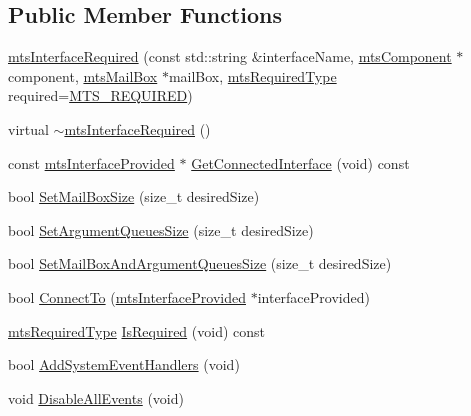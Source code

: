 \subsection*{Public Member Functions}
\begin{DoxyCompactItemize}
\item 
\hyperlink{classmts_interface_required_a63ce5c4fbbfae3627f118818707b8712}{mts\-Interface\-Required} (const std\-::string \&interface\-Name, \hyperlink{classmts_component}{mts\-Component} $\ast$component, \hyperlink{classmts_mail_box}{mts\-Mail\-Box} $\ast$mail\-Box, \hyperlink{mts_forward_declarations_8h_a9ef1ce54724afde7802db326ff8606f3}{mts\-Required\-Type} required=\hyperlink{mts_forward_declarations_8h_a9ef1ce54724afde7802db326ff8606f3ae01fd85391b60e546bbb1be9716c4ec9}{M\-T\-S\-\_\-\-R\-E\-Q\-U\-I\-R\-E\-D})
\item 
virtual \hyperlink{classmts_interface_required_ac44703c9161331b2b816ffbecac1e661}{$\sim$mts\-Interface\-Required} ()
\item 
const \hyperlink{classmts_interface_provided}{mts\-Interface\-Provided} $\ast$ \hyperlink{classmts_interface_required_a461c0fbbf35afcb27fb849abd1e0b093}{Get\-Connected\-Interface} (void) const 
\item 
bool \hyperlink{classmts_interface_required_ab87c1f6386cd1e27457af53a8f01d95e}{Set\-Mail\-Box\-Size} (size\-\_\-t desired\-Size)
\item 
bool \hyperlink{classmts_interface_required_a1f1d352367c25bdad40115a39638f12e}{Set\-Argument\-Queues\-Size} (size\-\_\-t desired\-Size)
\item 
bool \hyperlink{classmts_interface_required_a4c67d774d33c69ee2777549f9192d89b}{Set\-Mail\-Box\-And\-Argument\-Queues\-Size} (size\-\_\-t desired\-Size)
\item 
bool \hyperlink{classmts_interface_required_aa92fb5c95ad7f9fd4100cec0105e3381}{Connect\-To} (\hyperlink{classmts_interface_provided}{mts\-Interface\-Provided} $\ast$interface\-Provided)
\item 
\hyperlink{mts_forward_declarations_8h_a9ef1ce54724afde7802db326ff8606f3}{mts\-Required\-Type} \hyperlink{classmts_interface_required_ab9532cdc6e9e1674f69e9072a7c38ae2}{Is\-Required} (void) const 
\item 
bool \hyperlink{classmts_interface_required_a8830a8a10b35d4a57396edbb4e328012}{Add\-System\-Event\-Handlers} (void)
\item 
void \hyperlink{classmts_interface_required_a76076bd77bae78e5c9dec3b392dd3448}{Disable\-All\-Events} (void)
\item 

\end{DoxyCompactItemize}
